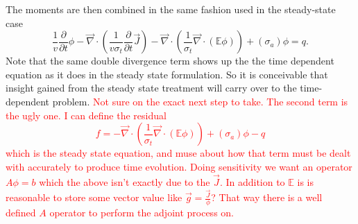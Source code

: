 \documentclass[12pt]{report}
\renewcommand{\div}{\vec{\nabla} \cdot}
\newcommand{\Edd}{\mathbb{E}}
\newcommand{\sigt}{\sigma_t}
\newcommand{\siga}{\sigma_a}
\newcommand{\scalSource}{q}
\newcommand{\comment}[2]{\marginpar{\textcolor{#2}{$\star$}}\textcolor{#2}{#1}\newline}
\newcommand{\iwh}[1]{\comment{#1}{red}}
\newcommand{\iwh}[1]{\phantom{a}}
\begin{document}
\begin{appendices}
The moments are then combined in the same fashion used in the steady-state case
\begin{equation}
\label{VETTrans}
\frac{1}{v} \frac{\partial}{\partial t}\phi - \div \left( \frac{1}{v \sigt} \frac{\partial}{\partial t}\vec{J} \right)   - \div \left( \frac{1}{\sigt} \div \left( \Edd \phi \right) \right)  + (\siga) \phi = \scalSource.
\end{equation}
Note that the same double divergence term shows up the the time dependent equation as it does in the steady state formulation. So it is conceivable that insight gained from the steady state treatment will carry over to the time-dependent problem. 
\iwh{Not sure on the exact next step to take. The second term is the ugly one. I can define the residual 
\begin{equation}
f=- \div \left( \frac{1}{\sigt} \div \left( \Edd \phi \right) \right)  + (\siga) \phi - \scalSource
\end{equation}
which is the steady state equation, and muse about how that term must be dealt with accurately to produce time evolution. 
Doing sensitivity we want an operator $A \phi = b$ which the above isn't exactly due to the $\vec{J}$. In addition to $\Edd$ is is reasonable to store some vector value like $\vec{g}=\frac{\vec{J}}{\phi}$? That way there is a well defined $A$ operator to perform the adjoint process on.}


\end{appendices}
\end{document}
